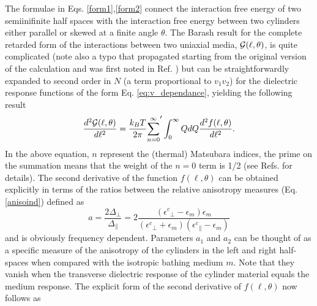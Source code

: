 \documentclass[onecolumn,letterpaper,amsmath,amssymb,floatfix,aps,superscriptaddress]{revtex4}
\begin{document}
The formulae in Eqs. \ref{form1},\ref{form2} connect the interaction free energy of two semiinifinite half spaces with the interaction free energy between two cylinders either 
parallel or skewed at a finite angle $\theta$. The Barash result \cite{Barash} for the complete retarded form of the interactions between two uniaxial media, ${\cal G}(\ell,\theta)$, 
is quite complicated (note also a typo that propagated starting from the original version of the calculation \cite{erratum} and was first noted in Ref. ) but can be straightforwardly expanded to second order 
in $N$ (a term proportional to $v_1 v_2$) for the dielectric response functions of the form Eq. \ref{eq:v_dependance}, yielding the following result
\begin{equation}
\frac{d^{2}{\cal G}(\ell,\theta)}{d\ell^{2}} = \frac{k_BT}{2\pi} {\sum_{n=0}^{\infty}}' \int_0^{\infty} Q dQ \frac{d^{2}f(\ell,\theta)}{d\ell^{2}}.
\end{equation}
In the above equation, $n$ represent the (thermal) Matsubara indices, the prime on the summation means  that the weight of the $n=0$ term is 1/2 (see Refs.  for details). The second derivative of the function $f(\ell,\theta)$ can be obtained explicitly 
in terms of the ratios between the relative anisotropy measures (Eq. \ref{anisoind}) defined as 
\begin{equation}
a = \frac{2 \Delta_{\perp}}{\Delta_{\parallel}} = 2 \frac{({\epsilon^{c}}_{\perp}-\epsilon_{m}) \epsilon_{m}}{({\epsilon^{c}}_{\perp}+\epsilon_{m}) ({\epsilon^{c}}_{\parallel}-\epsilon_{m})}
\label{eq:adef}
\end{equation}
and is obviously frequency dependent. Parameters $a_1$ and $a_2$ can be thought of as a specific measure of the anisotropy of the cylinders in the left and right half-spaces when 
compared with the isotropic bathing medium $m$. Note that they vanish when the transverse dielectric response of the cylinder material equals the medium response. 
The explicit form of the second derivative of $f(\ell,\theta)$ now follows as 
\end{document}
